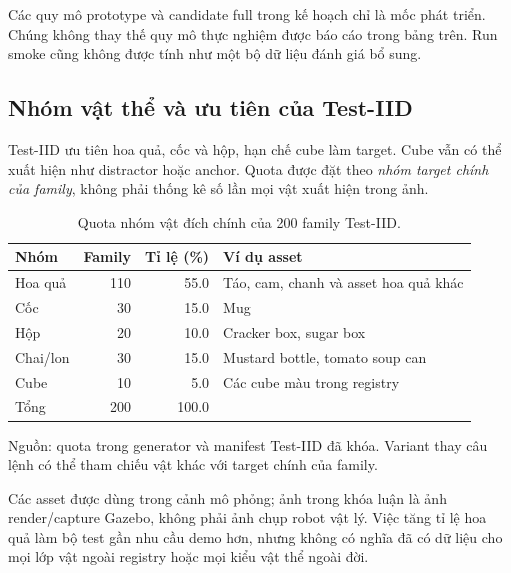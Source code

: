 Các quy mô prototype và candidate full trong kế hoạch chỉ là
mốc phát triển. Chúng không thay thế quy mô thực nghiệm được
báo cáo trong bảng trên. Run smoke cũng không được tính như
một bộ dữ liệu đánh giá bổ sung.

\subsection{Nhóm vật thể và ưu tiên của Test-IID}

Test-IID ưu tiên hoa quả, cốc và hộp, hạn chế cube làm target.
Cube vẫn có thể xuất hiện như distractor hoặc anchor.
Quota được đặt theo \emph{nhóm target chính của family}, không
phải thống kê số lần mọi vật xuất hiện trong ảnh.

\begin{table}[htbp]
    \centering
    \setlength{\tabcolsep}{4pt}
    \renewcommand{\arraystretch}{1.15}
    \caption{Quota nhóm vật đích chính của 200 family Test-IID.}
    \label{tab:setup-object-quota}
    \small
    \begin{tabularx}{\textwidth}{@{}lrr>{\raggedright\arraybackslash}X@{}}
        \toprule
        Nhóm & Family & Tỉ lệ (\%) & Ví dụ asset \\
        \midrule
        Hoa quả & 110 & 55.0 & Táo, cam, chanh và asset hoa quả khác \\
        Cốc & 30 & 15.0 & Mug \\
        Hộp & 20 & 10.0 & Cracker box, sugar box \\
        Chai/lon & 30 & 15.0 & Mustard bottle, tomato soup can \\
        Cube & 10 & 5.0 & Các cube màu trong registry \\
        \midrule
        Tổng & 200 & 100.0 & \\
        \bottomrule
    \end{tabularx}
    \vspace{2pt}
    {\footnotesize\raggedright Nguồn: quota trong generator và manifest
    Test-IID đã khóa. Variant thay câu lệnh có thể tham chiếu
    vật khác với target chính của family.\par}
\end{table}

Các asset được dùng trong cảnh mô phỏng; ảnh trong khóa luận
là ảnh render/capture Gazebo, không phải ảnh chụp robot vật lý.
Việc tăng tỉ lệ hoa quả làm bộ test gần nhu cầu demo hơn,
nhưng không có nghĩa đã có dữ liệu cho mọi lớp vật ngoài
registry hoặc mọi kiểu vật thể ngoài đời.

